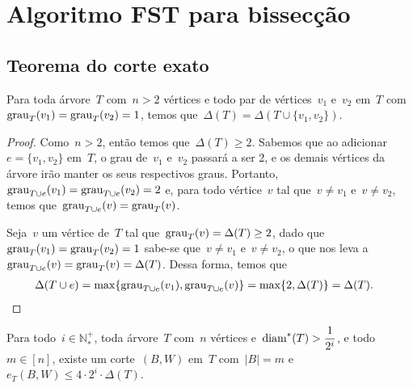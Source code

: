 \section {Algoritmo FST para bissecção}

	\subsection{Teorema do corte exato}
	\begin{lem}
	\label{lem:grauMaximo}
		Para toda árvore~$T$ com~${n>2}$ vértices
		e todo par de vértices~$v_1$ e~$v_2$ em~$T$ 
		com~${\mathrm{grau}_T(v_1)=\mathrm{grau}_T(v_2)=1}$,
		temos que~${\Delta(T) = \Delta(T\cup \{v_1,v_2\})}$.
	\end{lem}
	
	
	\begin{proof}
		Como~${n>2}$, então temos que~${\Delta(T)\ge 2}$.
		Sabemos que ao adicionar~${e = \{v_1,v_2\}}$ em~$T$, 
		o grau de~$v_1$
		e~$v_2$ passará a ser 2, e os demais vértices da árvore
		irão manter os seus respectivos graus.
		Portanto,~${\mathrm{grau}_{T\cup e}(v_1)=\mathrm{grau}_{T\cup e}(v_2)=2}$
		e, para todo vértice~$v$ tal que~$v\ne v_1$ e~$v\ne v_2$,
		temos que~${\mathrm{grau}_{T\cup e}(v)=\mathrm{grau}_T(v)}$.
		
		Seja~$v$ um vértice de~$T$ tal 
		que~${\mathrm{grau}_T(v) = \Delta(T)\ge 2}$,
		dado que~${\mathrm{grau}_T(v_1)=\mathrm{grau}_T(v_2)=1}$
		sabe-se que~${v\ne v_1}$ e~${v\ne v_2}$, o que nos leva 
		a~${\mathrm{grau}_{T\cup e}(v)=\mathrm{grau}_T(v)=\Delta(T)}$.
		Dessa forma, temos que
		\begin{align}
			\Delta(T\cup e) &= \max\{\mathrm{grau}_{T\cup e}(v_1), 
			\mathrm{grau}_{T\cup e}(v)\}
         		= \max\{2, \Delta(T)\}
         		= \Delta(T). \nonumber
		\end{align}		

	\end{proof}

	\bigskip
	\bigskip
	\bigskip

	\begin{teo}
	\label{teo:corteExato}
		Para todo~${i\in \mathbb{N^+_*}}$, toda árvore~$T$ com~$n$
		vértices e~${\mathrm{diam}^*(T)>\dfrac{1}{2^i}}$, e todo~${m\in[n]}$,
		existe um corte~$(B,W)$ em~$T$ com~$|B|=m$ 
		e~$e_T(B,W)\le 4\cdot 2^i\cdot \Delta(T)$.
	\end{teo}

